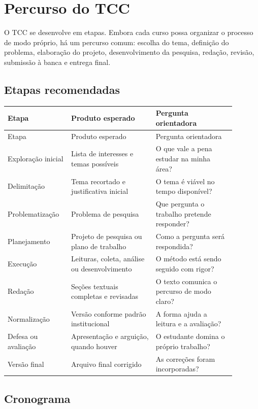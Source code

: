 \chapter{Percurso do TCC}

O TCC se desenvolve em etapas. Embora cada curso possa organizar o processo de modo próprio, há um percurso comum: escolha do tema, definição do problema, elaboração do projeto, desenvolvimento da pesquisa, redação, revisão, submissão à banca e entrega final.

\section{Etapas recomendadas}

\begin{longtable}{p{0.23\linewidth}p{0.34\linewidth}p{0.32\linewidth}}
\toprule
Etapa & Produto esperado & Pergunta orientadora \\
\midrule
\endfirsthead
\toprule
Etapa & Produto esperado & Pergunta orientadora \\
\midrule
\endhead
Exploração inicial & Lista de interesses e temas possíveis & O que vale a pena estudar na minha área? \\
Delimitação & Tema recortado e justificativa inicial & O tema é viável no tempo disponível? \\
Problematização & Problema de pesquisa & Que pergunta o trabalho pretende responder? \\
Planejamento & Projeto de pesquisa ou plano de trabalho & Como a pergunta será respondida? \\
Execução & Leituras, coleta, análise ou desenvolvimento & O método está sendo seguido com rigor? \\
Redação & Seções textuais completas e revisadas & O texto comunica o percurso de modo claro? \\
Normalização & Versão conforme padrão institucional & A forma ajuda a leitura e a avaliação? \\
Defesa ou avaliação & Apresentação e arguição, quando houver & O estudante domina o próprio trabalho? \\
Versão final & Arquivo final corrigido & As correções foram incorporadas? \\
\bottomrule
\end{longtable}

\section{Cronograma}

